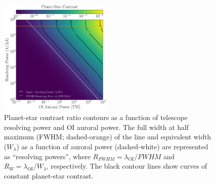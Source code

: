 \documentclass{emulateapj}
\newcommand{\XXX}[1]{#1}      %
\begin{document}
\begin{figure}[bt]
\includegraphics[width=0.49\textwidth]{contrast_vs_R_vs_watts.pdf}
\caption{Planet-star contrast ratio contours as a function of telescope resolving power and OI auroral power. The full width at half maximum (FWHM; dashed-orange) of the line and equivalent width ($W_{\lambda}$) as a function of auroral power (dashed-white) are represented as ``resolving powers'', where $R_{FWHM} = \lambda_{\text{OI}} / FWHM$ and $R_{W} = \lambda_{\text{OI}} / W_{\lambda}$, respectively.  \XXX{The black contour lines show curves of constant planet-star contrast.}}
\label{fig:contrast}
\end{figure}
\end{document}
